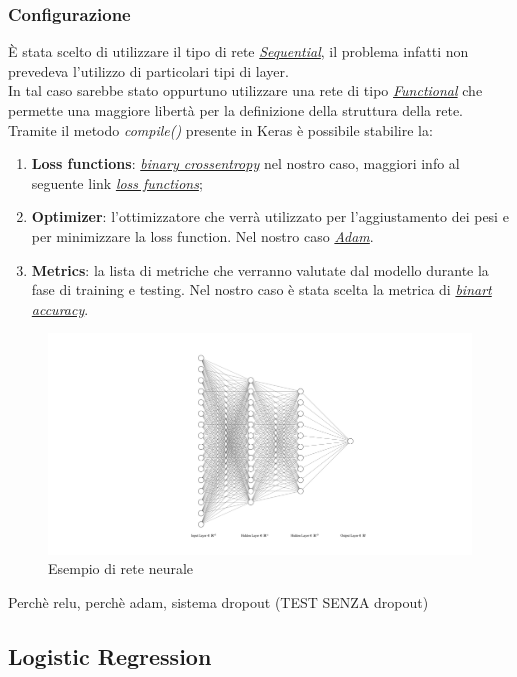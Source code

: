 \subsubsection{Configurazione}
È stata scelto di utilizzare il tipo di rete \href{https://keras.io/getting-started/sequential-model-guide/}{\textit{Sequential}}, il problema infatti non prevedeva l'utilizzo di particolari tipi di layer.\\ 
In tal caso sarebbe stato oppurtuno utilizzare una rete di tipo \href{https://keras.io/getting-started/functional-api-guide/}{\textit{Functional}} che permette una maggiore libertà per la definizione della struttura della rete.
Tramite il metodo \textit{compile()} presente in Keras è possibile stabilire la:
\begin{enumerate}
\item \textbf{Loss functions}: \href{https://en.wikipedia.org/wiki/Cross_entropy}{\textit{binary crossentropy}} nel nostro caso, maggiori info al seguente link \href{https://keras.io/losses/}{\textit{loss functions}};
\item \textbf{Optimizer}: l'ottimizzatore che verrà utilizzato per l'aggiustamento dei pesi e per minimizzare la loss function.
Nel nostro caso \href{https://arxiv.org/pdf/1412.6980v8.pdf}{\textit{Adam}}. 
\item \textbf{Metrics}: la lista di metriche che verranno valutate dal modello durante la fase di training e testing.
Nel nostro caso è stata scelta la metrica di \href{https://keras.io/metrics/#binary_accuracy}{\textit{binart accuracy}}.  
\end{enumerate} 


\begin{figure}[H]
\includegraphics[scale=0.5,center]{img/nnExample.png}
\caption{Esempio di rete neurale}
\end{figure}

Perchè relu, perchè adam, sistema dropout
(TEST SENZA dropout)
\subsection{Logistic Regression}